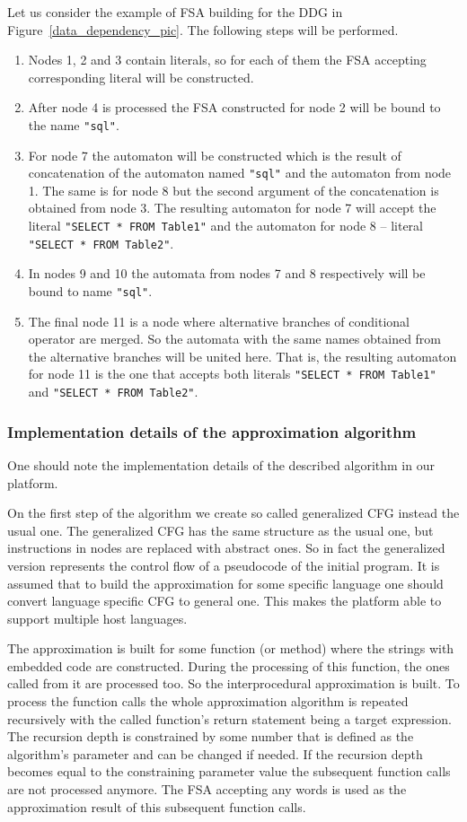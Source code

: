 \documentclass{sig-alternate-05-2015}
\begin{document}
Let us consider the example of FSA building for the DDG in Figure~\ref{data_dependency_pic}. The following steps will be performed.
\begin{enumerate}
\item Nodes 1, 2 and 3 contain literals, so for each of them the FSA accepting corresponding literal will be constructed.
\item After node 4 is processed the FSA constructed for node 2 will be bound to the name \verb|"sql"|.
\item For node 7 the automaton will be constructed which is the result of concatenation of the automaton named \verb|"sql"| and the automaton from node 1. The same is for node 8 but the second argument of the concatenation is obtained from node 3. The resulting automaton for node 7 will accept the literal  \texttt{"SELECT * FROM Table1"} and the automaton for node 8 -- literal \texttt{"SELECT * FROM Table2"}.
\item In nodes 9 and 10 the automata from nodes 7 and 8 respectively will be bound to name \verb|"sql"|.
\item The final node 11 is a node where alternative branches of conditional operator are merged. So the automata with the same names obtained from the alternative branches will be united here. That is, the resulting automaton for node 11 is the one that accepts both literals \texttt{"SELECT * FROM Table1"} and \texttt{"SELECT * FROM Table2"}.

\end{enumerate}

\subsubsection{Implementation details of the approximation algorithm}

One should note the implementation details of the described algorithm in our platform.

On the first step of the algorithm we create so called generalized CFG instead the usual one. The generalized CFG has the same structure as the usual one, but instructions in nodes are replaced with abstract ones. So in fact the generalized version represents the control flow of a pseudocode of the initial program. It is assumed that to build the approximation for some specific language one should convert language specific CFG to general one. This makes the platform able to support multiple host languages.

The approximation is built for some function (or method) where the strings with embedded code are constructed. During the processing of this function, the ones called from it are processed too. So the interprocedural approximation is built. To process the function calls the whole approximation algorithm is repeated recursively with the called function's return statement being a target expression. The recursion depth is constrained by some number that is defined as the algorithm's parameter and can be changed if needed. If the recursion depth becomes equal to the constraining parameter value the subsequent function calls are not processed anymore. The FSA accepting any words is used as the approximation result of this subsequent function calls.
\end{document}
